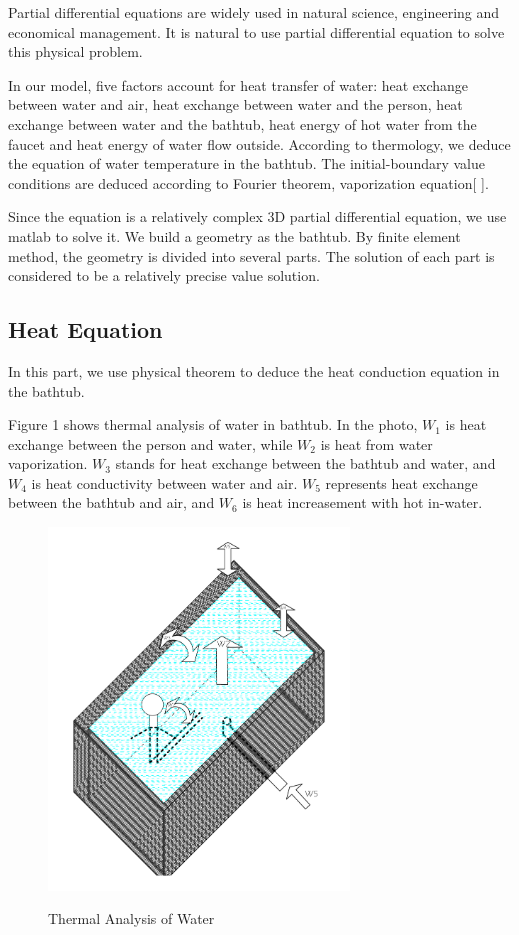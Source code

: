 \documentclass[12pt,a4paper,titlepage]{article}
\begin{document}
Partial differential equations are widely used in natural science, engineering and economical management.
It is natural to use partial differential equation to solve this physical problem.

In our model, five factors account for heat transfer of water: heat exchange between water and air, heat
exchange between water and the person, heat exchange between water and the bathtub, heat energy of hot water from the
faucet and heat energy of water flow outside. According to thermology, we deduce the equation
of water temperature in the bathtub. The initial-boundary value conditions are deduced according to
Fourier theorem, vaporization equation[ ].

Since the equation is a relatively complex 3D partial differential equation, we use matlab to solve it.
We build a geometry as the bathtub. By finite element method, the geometry is divided into several parts.
The solution of each part is considered to be a relatively precise value solution.



\subsection{Heat Equation}
\label{sec:heat equation}

In this part, we use physical theorem to deduce the heat conduction equation in the bathtub.

Figure 1 shows thermal analysis of water in bathtub.
In the photo, $W_1$ is heat exchange between the person and water, while $W_2$ is heat from water vaporization. $W_3$ stands for heat exchange between the bathtub and water, and $W_4$ is heat conductivity between water and air. $W_5$ represents heat exchange between the bathtub and air, and $W_6$ is heat increasement with hot in-water.
\begin{figure}[htb]
  \centering
  \includegraphics[width=8cm]{2.pdf}\\
  \caption{Thermal Analysis of Water}\label{1_p}
\end{figure}
\end{document}
